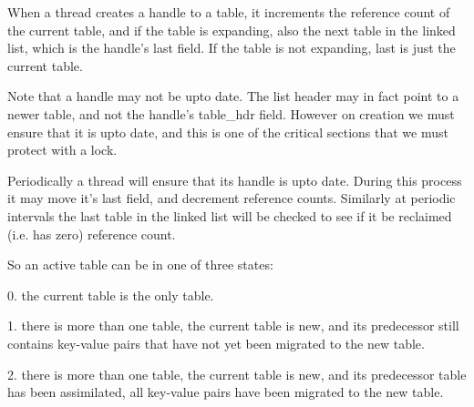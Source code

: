 






When a thread creates a handle to a table, it increments the reference
count of the current table, and if the table is expanding, also the
next table in the linked list, which is the handle's last field.  If
the table is not expanding, last is just the current table.

Note that a handle may not be upto date. The list
header may in fact point to a newer table, and not the handle's table\_hdr
field. However on creation we must ensure that it is upto date, and
this is one of the critical sections that we must protect with a lock.

Periodically a thread will ensure that its handle is upto date. During this process
it may move it's last field, and decrement reference counts. Similarly
at periodic intervals the last table in the linked list will be checked to see
if it be reclaimed (i.e. has zero) reference count.



So an active table can be in one of three states:

0. the current table is the only table.

1. there is more than one table, the current table is new, and its
predecessor still contains key-value pairs that have not yet been
migrated to the new table.

2. there is more than one table, the current table is new, and its
predecessor table has been assimilated, all key-value pairs have been
migrated to the new table.


